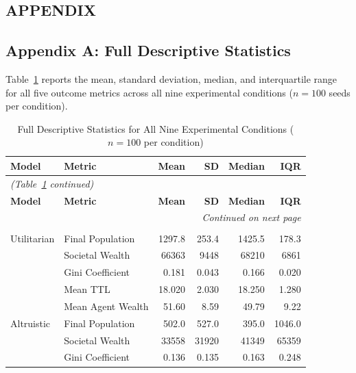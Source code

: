 \documentclass{icsthesis}
\begin{document}
\begin{mainmatter}
		\section{APPENDIX}

		\subsection*{Appendix A: Full Descriptive Statistics}

		Table~\ref{table:app-desc-all} reports the mean, standard deviation, median, and interquartile range for all five outcome metrics across all nine experimental conditions ($n = 100$ seeds per condition).

		\renewcommand{\arraystretch}{1.3}
		\begin{longtable}{l l r r r r}
		\caption{Full Descriptive Statistics for All Nine Experimental Conditions ($n = 100$ per condition)}
		\label{table:app-desc-all} \\
		\hline\hline
		\textbf{Model} & \textbf{Metric} & \textbf{Mean} & \textbf{SD} & \textbf{Median} & \textbf{IQR} \\
		\hline
		\endfirsthead
		\multicolumn{6}{l}{\footnotesize\textit{(Table~\ref{table:app-desc-all} continued)}} \\
		\hline\hline
		\textbf{Model} & \textbf{Metric} & \textbf{Mean} & \textbf{SD} & \textbf{Median} & \textbf{IQR} \\
		\hline
		\endhead
		\hline
		\multicolumn{6}{r}{\footnotesize\textit{Continued on next page}} \\
		\endfoot
		\hline
		\endlastfoot
		\multicolumn{6}{l}{\textit{Distributed configuration ($d = 14$)}} \\
		\hline
		Utilitarian & Final Population      & 1297.8 & 253.4  & 1425.5 & 178.3 \\
		            & Societal Wealth       & 66363  & 9448   & 68210  & 6861  \\
		            & Gini Coefficient      & 0.181  & 0.043  & 0.166  & 0.020 \\
		            & Mean TTL              & 18.020 & 2.030  & 18.250 & 1.280 \\
		            & Mean Agent Wealth     & 51.60  & 8.59   & 49.79  & 9.22  \\
		Altruistic  & Final Population      & 502.0  & 527.0  & 395.0  & 1046.0 \\
		            & Societal Wealth       & 33558  & 31920  & 41349  & 65359  \\
		            & Gini Coefficient      & 0.136  & 0.135  & 0.163  & 0.248  \\

\end{longtable}
\end{mainmatter}
\end{document}

